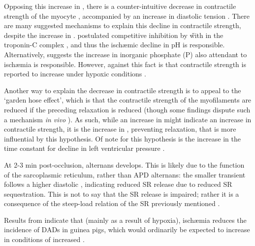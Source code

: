 \documentclass[../thesis-main.tex]{subfiles}
\begin{document}
 Opposing this increase in \cai{}, there is a counter-intuitive decrease in contractile strength of the myocyte \citep{Lee1988, Kaplan1992}, accompanied by an increase in diastolic tension \citep{Mubagwa1995}. There are many suggested mechanisms to explain this decline in contractile strength, despite the increase in \cai{}. \citet{Mohabir1991} postulated competitive inhibition by \H with \ca{} in the troponin-C complex \citep{Blanchard1984}, and thus the isch\ae{}mic decline in pH is responsible. Alternatively, \citet{Camacho1993} suggests the increase in inorganic phosphate (P) also attendant to isch\ae{}mia is responsible. However, against this fact is that contractile strength is reported to increase under hypoxic conditions \citep{Kihara1989}.
 
 Another way to explain the decrease in contractile strength is to appeal to the `garden hose effect', which is that the contractile strength of the myofilaments are reduced if the preceding relaxation is reduced \citep{Camacho1993, Kleber1987, Kleber1987b, Vogel1982} (though some findings dispute such a mechanism \emph{in vivo} \citep{Zhao1988}). As such, while an increase in \casys{} might indicate an increase in contractile strength, it is the increase in \cadia{}, preventing relaxation, that is more influential by this hypothesis. Of note for this hypothesis is the increase in the time constant for decline in left ventricular pressure \citep{Serizawa1981, Applegate1987, Serizawa1987, Isoyama1987}.
 
 At 2-3 min post-occlusion, \cai{} alternans develops. This is likely due to the function of the sarcoplasmic reticulum, rather than APD alternans: the smaller transient follows a higher diastolic \cai{}, indicating reduced SR release due to reduced SR sequestration. This is not to say that the SR release is impaired; rather it is a consequence of the steep-load relation of the SR previously mentioned \citep{Shiferaw2003, Restrepo2008}.
 
 Results from \citet{Coetzee1987} indicate that (mainly as a result of hypoxia), isch\ae{}mia reduces the incidence of DADs in guinea pigs, which would ordinarily be expected to increase in conditions of increased \cai{}.
 
 
\end{document}
